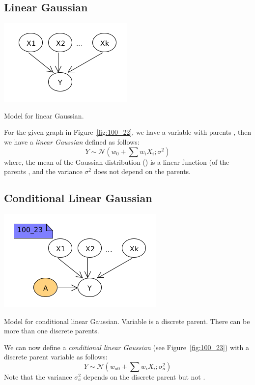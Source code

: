 \subsection{Linear Gaussian}
\begin{marginfigure}
\includegraphics{images/100_22}
\caption{Model for linear Gaussian.}
\label{fig:100_22}
\end{marginfigure}
For the given graph in Figure~\ref{fig:100_22}, we have a variable  with parents , then we have a \emph{linear Gaussian} defined as follows:
\[ Y \sim \mathcal{N} (w_0 +  \sum w_i X_i; \sigma^2 )\]
where,  the mean of the Gaussian distribution () is a linear function (of the parents , and the variance $\sigma^2$ does not depend on the parents.

\subsection{Conditional Linear Gaussian}
\begin{marginfigure}
\includegraphics{images/100_23}
\caption{Model for conditional linear Gaussian.  Variable  is a discrete parent.  There can be more than one discrete parents.}
\label{fig:100_23}
\end{marginfigure}
We can now define a \emph{conditional linear Gaussian} (see Figure~\ref{fig:100_23}) with a discrete parent variable  as follows:
\[ Y \sim \mathcal{N} (w_{a0} +  \sum w_i X_i; \sigma^2_a )\]
Note that the variance $\sigma^2_a$ depends on the discrete parent  but not .




